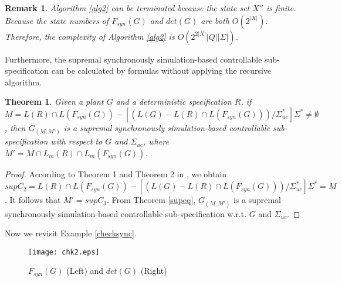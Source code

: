 \documentclass[preprint,authoryear,12pt]{elsarticle}
\newtheorem{Theorem}{Theorem}
\newtheorem{Remark}{Remark}
\begin{document}
\begin{Remark}
Algorithm \ref{alg2} can be terminated because the state set $X''$
is finite. Because the state numbers of $F_{syn}(G)$ and $det(G)$
are both $O(2^{|X|})$. Therefore, the complexity of Algorithm
\ref{alg2} is $O(2^{2|X|}|Q||\Sigma|)$.
\end{Remark}









Furthermore, the supremal synchronously simulation-based
controllable sub-specification can be calculated by formulas
without applying the recursive algorithm.


\begin{Theorem}\label{calsupsub}
Given a plant $G$ and a deterministic specification $R$, if
$M=L(R)\cap L(F_{syn}(G))-[(L(G)-L(R) \cap
L(F_{syn}(G)))/\Sigma_{uc}^{*}]\Sigma^{*}\neq\emptyset$, then
$G_{(M, M')}$ is a supremal synchronously simulation-based
controllable sub-specification with respect to $G$ and
$\Sigma_{uc}$, where $M'=M \cap L_{m}(R) \cap L_{m}(F_{syn}(G))$.
\end{Theorem}
\begin{proof}
According to Theorem 1 and Theorem 2 in
\citep{brandt1990formulas}, we obtain $supC_2=L(R) \cap
L(F_{syn}(G))-[(L(G)-L(R) \cap
L(F_{syn}(G)))/\Sigma_{uc}^{*}]\Sigma^{*}=M$. It follows that
$M'=supC_3$. From Theorem \ref{supeq}, $G_{(M, M')}$ is a supremal
synchronously simulation-based controllable sub-specification
w.r.t. $G$ and $\Sigma_{uc}$.
\end{proof}



Now we revisit Example \ref{checksync}.

\begin{figure}[!htb]
\begin{center}
\texttt{[image: chk2.eps]}
\caption{ $F_{syn}(G)$ (Left) and $det(G)$ (Right)} \label{chk2}
\end{center}
\end{figure}
\end{document}

